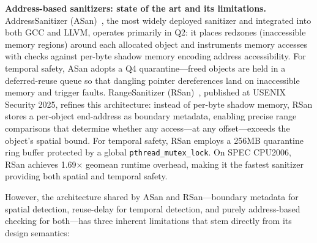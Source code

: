 \documentclass[cmc,article,submit,moreauthors,pdftex]{Definitions/tsp}
\begin{document}
\textbf{Address-based sanitizers: state of the art and its limitations.}
AddressSanitizer (ASan)~\cite{serebryany2012addresssanitizer}, the most widely deployed sanitizer and integrated into both GCC and LLVM, operates primarily in Q2: it places redzones (inaccessible memory regions) around each allocated object and instruments memory accesses with checks against per-byte shadow memory encoding address accessibility. For temporal safety, ASan adopts a Q4 quarantine---freed objects are held in a deferred-reuse queue so that dangling pointer dereferences land on inaccessible memory and trigger faults. RangeSanitizer (RSan)~\cite{gorter2025rsan}, published at USENIX Security 2025, refines this architecture: instead of per-byte shadow memory, RSan stores a per-object end-address as boundary metadata, enabling precise range comparisons that determine whether any access---at any offset---exceeds the object's spatial bound. For temporal safety, RSan employs a 256MB quarantine ring buffer protected by a global \texttt{pthread\_mutex\_lock}. On SPEC CPU2006, RSan achieves 1.69$\times$ geomean runtime overhead, making it the fastest sanitizer providing both spatial and temporal safety.

However, the architecture shared by ASan and RSan---boundary metadata for spatial detection, reuse-delay for temporal detection, and purely address-based checking for both---has three inherent limitations that stem directly from its design semantics:
\end{document}
